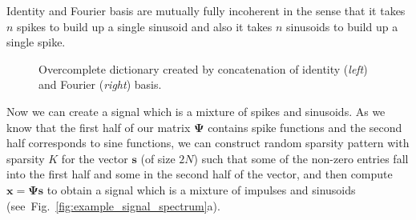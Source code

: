 \documentclass[journal]{IEEEtran}
\begin{document}
Identity and Fourier basis are mutually fully incoherent in the sense that it takes $n$ spikes to build up a single sinusoid and also it takes $n$ sinusoids to build up a single spike.
%
\begin{figure}[h] 
	\centering
	
	\caption{Overcomplete dictionary created by concatenation of identity (\textit{left}) and Fourier (\textit{right}) basis.}
	
	\label{fig:dictionary}
	
\end{figure}
%
Now we can create a signal which is a mixture of spikes and sinusoids. As we know that the first half of our matrix $\boldsymbol{\Psi}$ contains spike functions and the second half corresponds to sine functions, we can construct random sparsity pattern with sparsity $K$ for the vector $\boldsymbol{s}$ (of size $2N$) such that some of the non-zero entries fall into the first half and some in the second half of the vector, and then compute $\boldsymbol{x}=\boldsymbol{\Psi} \boldsymbol{s}$ to obtain a signal which is a mixture of impulses and sinusoids (see~Fig.~\ref{fig:example_signal_spectrum}a).
%
\end{document}
